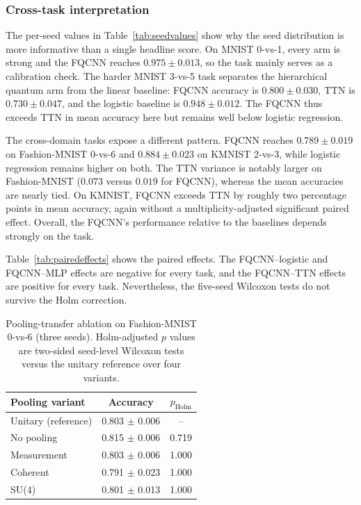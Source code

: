 \documentclass[conference]{IEEEtran}
\begin{document}
\subsubsection{Cross-task interpretation}
The per-seed values in Table~\ref{tab:seedvalues} show why the seed distribution is
more informative than a single headline score. On MNIST 0-vs-1, every arm is
strong and the FQCNN reaches $0.975\pm0.013$, so the task mainly serves as a
calibration check. The harder MNIST 3-vs-5 task
separates the hierarchical quantum arm from the linear baseline: FQCNN accuracy
is $0.800\pm0.030$, TTN is $0.730\pm0.047$, and the logistic baseline is
$0.948\pm0.012$. The FQCNN thus exceeds TTN in mean accuracy here but remains well below logistic regression.

The cross-domain tasks expose a different pattern. FQCNN reaches
$0.789\pm0.019$ on Fashion-MNIST 0-vs-6 and $0.884\pm0.023$ on KMNIST 2-vs-3,
while logistic regression remains higher on both. The TTN variance is notably
larger on Fashion-MNIST ($0.073$ versus $0.019$ for FQCNN), whereas the mean
accuracies are nearly tied. On KMNIST, FQCNN exceeds TTN by roughly two
percentage points in mean accuracy, again without a multiplicity-adjusted
significant paired effect. Overall, the FQCNN's performance relative to the baselines depends strongly on the task.

Table~\ref{tab:pairedeffects} shows the paired effects. The
FQCNN--logistic and FQCNN--MLP effects are negative for every task, and the
FQCNN--TTN effects are positive for every task. Nevertheless, the five-seed
Wilcoxon tests do not survive the Holm correction. 

\begin{table}[!t]
\caption{Pooling-transfer ablation on Fashion-MNIST 0-vs-6 (three seeds). Holm-adjusted $p$ values are two-sided seed-level Wilcoxon tests versus the unitary reference over four variants.}
\label{tab:pooling-transfer}
\centering
\begin{tabular}{@{}lcc@{}}
\toprule
\textbf{Pooling variant} & \textbf{Accuracy} & \textbf{$p_{\mathrm{Holm}}$} \\
\midrule
Unitary (reference) & 0.803 $\pm$ 0.006 & -- \\
No pooling & 0.815 $\pm$ 0.006 & 0.719 \\
Measurement & 0.803 $\pm$ 0.006 & 1.000 \\
Coherent & 0.791 $\pm$ 0.023 & 1.000 \\
SU(4) & 0.801 $\pm$ 0.013 & 1.000 \\
\bottomrule
\end{tabular}
\end{table}
\end{document}

